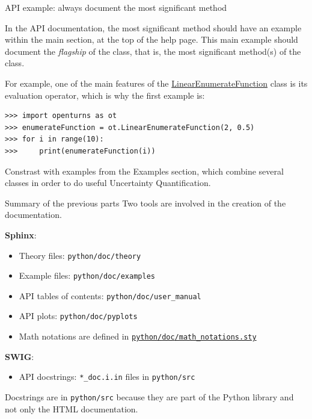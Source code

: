 \documentclass[8pt]{beamer}
\begin{document}
\begin{frame}[fragile]{API example: always document the most significant method}

\lstset{style=mystyle, language=python}

In the API documentation, the \alert{most significant method} should have an
example within the main section, at the top of the help page.
This main example should document the \alert{\emph{flagship}} of the class, that is, 
the most significant method(s) of the class.

For example, one of the main features of the \href{https://openturns.github.io/openturns/master/user_manual/_generated/openturns.LinearEnumerateFunction.html}{\alert{LinearEnumerateFunction}}
class is its evaluation operator, which is why the first example is:

\begin{lstlisting}
>>> import openturns as ot
>>> enumerateFunction = ot.LinearEnumerateFunction(2, 0.5)
>>> for i in range(10):
>>>     print(enumerateFunction(i))
\end{lstlisting}

Constrast with examples from the \alert{Examples} section,
which \alert{combine several classes} in order to do useful Uncertainty Quantification.
\end{frame}


\begin{frame}{Summary of the previous parts}
Two tools are involved in the creation of the documentation.

\textbf{Sphinx}:
\begin{itemize}
    \item Theory files: \texttt{python/\alert{doc}/theory}
    \item Example files: \texttt{python/\alert{doc}/examples}
    \item API tables of contents: \texttt{python/\alert{doc}/user\_manual}
    \item API plots: \texttt{python/\alert{doc}/pyplots}
    \item Math notations are defined in \href{https://github.com/openturns/openturns/blob/master/python/doc/math_notations.sty}{\texttt{python/\alert{doc}/math\_notations.sty}}
\end{itemize}

\textbf{SWIG}:
\begin{itemize}
    \item API docstrings: \texttt{*\_doc.i.in} files in \texttt{python/\alert{src}}
\end{itemize}

Docstrings are in \texttt{python/\alert{src}} because they are part of the Python library and not only the HTML documentation.

\end{frame}
\end{document}
